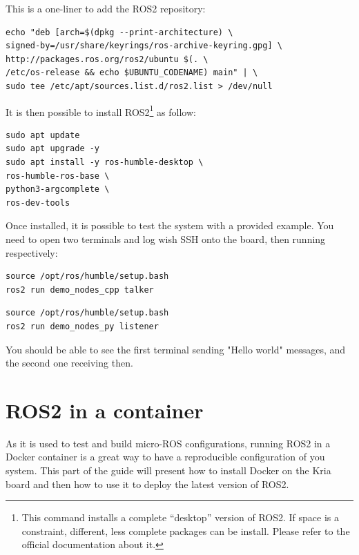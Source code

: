 \documentclass[10pt]{article}
\begin{document}
This is a one-liner to add the ROS2 repository:

\begin{tcolorbox}
\begin{verbatim}
echo "deb [arch=$(dpkg --print-architecture) \
signed-by=/usr/share/keyrings/ros-archive-keyring.gpg] \
http://packages.ros.org/ros2/ubuntu $(. \
/etc/os-release && echo $UBUNTU_CODENAME) main" | \
sudo tee /etc/apt/sources.list.d/ros2.list > /dev/null
\end{verbatim}
\end{tcolorbox}

It is then possible to install ROS2\footnote{This command installs a complete ``desktop'' version of ROS2. If space is a constraint, different, less complete packages can be install. Please refer to the official documentation about it.} as follow:

\begin{tcolorbox}
\begin{verbatim}
sudo apt update
sudo apt upgrade -y
sudo apt install -y ros-humble-desktop \
ros-humble-ros-base \
python3-argcomplete \
ros-dev-tools
\end{verbatim}
\end{tcolorbox}

Once installed, it is possible to test the system with a provided example.
You need to open two terminals and log wish SSH onto the board, then running
respectively:

\begin{tcolorbox}
\begin{verbatim}
source /opt/ros/humble/setup.bash
ros2 run demo_nodes_cpp talker
\end{verbatim}
\end{tcolorbox}



\begin{tcolorbox}
\begin{verbatim}
source /opt/ros/humble/setup.bash
ros2 run demo_nodes_py listener
\end{verbatim}
\end{tcolorbox}


You should be able to see the first terminal sending "Hello world" messages,
and the second one receiving then.


\section{ROS2 in a container}
As it is used to test and build micro-ROS configurations, running ROS2 in a
Docker container is a great way to have a reproducible configuration
of you system. This part of the guide will present how to install Docker on the
Kria board and then how to use it to deploy the latest version of ROS2.
\end{document}
